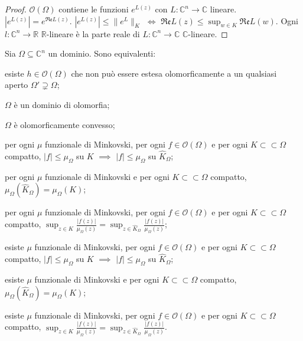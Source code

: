 \begin{proof}
  $\mathcal{O}(\Omega)$ contiene le funzioni $e^{L(z)}$ con $L: \mathbb{C}^n \longrightarrow \mathbb{C}$ lineare. $|e^{L(z)}|=e^{\mathfrak{Re}L(z)}$. $|e^{L(z)}| \le \|e^L\|_K$ $\iff$ $\displaystyle \mathfrak{Re}L(z) \le \sup_{w \in K} \mathfrak{Re}L(w)$.
  Ogni $l: \mathbb{C}^n \longrightarrow \mathbb{R}$ $\mathbb{R}$-lineare è la parte reale di $L:\mathbb{C}^n \longrightarrow \mathbb{C}$ $\mathbb{C}$-lineare.
\end{proof}

\begin{thm} \label{car_dom_olo}
  Sia $\Omega \subseteq \mathbb{C}^n$ un dominio. Sono equivalenti:
  \begin{nlist}
    \item esiste $h \in \mathcal{O}(\Omega)$ che non può essere estesa olomorficamente a un qualsiasi aperto $\Omega' \supsetneq \Omega$;
    \item $\Omega$ è un dominio di olomorfia;
    \item $\Omega$ è olomorficamente convesso;
    \item per ogni $\mu$ funzionale di Minkovski, per ogni $f \in \mathcal{O}(\Omega)$ e per ogni $K \subset\subset \Omega$ compatto, $|f| \le \mu_{\Omega}$ su $K$ $\implies$ $|f| \le \mu_\Omega$ su $\hat{K}_\Omega$;
    \item per ogni $\mu$ funzionale di Minkovski e per ogni $K \subset\subset \Omega$ compatto, $\mu_{\Omega}(\hat{K}_\Omega)=\mu_\Omega(K)$;
    \item per ogni $\mu$ funzionale di Minkovski, per ogni $f \in \mathcal{O}(\Omega)$ e per ogni $K \subset\subset \Omega$ compatto, $\displaystyle \sup_{z \in K} \frac{|f(z)|}{\mu_\Omega(z)}=\sup_{z\in\hat{K}_\Omega} \frac{|f(z)|}{\mu_\Omega(z)}$;
    \item esiste $\mu$ funzionale di Minkovski, per ogni $f \in \mathcal{O}(\Omega)$ e per ogni $K \subset\subset \Omega$ compatto, $|f| \le \mu_{\Omega}$ su $K$ $\implies$ $|f| \le \mu_\Omega$ su $\hat{K}_\Omega$;
    \item esiste $\mu$ funzionale di Minkovski e per ogni $K \subset\subset \Omega$ compatto, $\mu_{\Omega}(\hat{K}_\Omega)=\mu_\Omega(K)$;
    \item esiste $\mu$ funzionale di Minkovski, per ogni $f \in \mathcal{O}(\Omega)$ e per ogni $K \subset\subset \Omega$ compatto, $\displaystyle \sup_{z \in K} \frac{|f(z)|}{\mu_\Omega(z)}=\sup_{z\in\hat{K}_\Omega} \frac{|f(z)|}{\mu_\Omega(z)}$.
  \end{nlist}
\end{thm}

